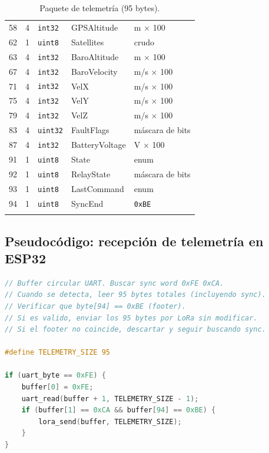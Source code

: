 \documentclass[11pt,a4paper]{article}
\begin{document}
\begin{longtable}{@{}ccllp{4.5cm}@{}}
58 & 4 & \texttt{int32}  & GPSAltitude      & m $\times$ 100 \\
62 & 1 & \texttt{uint8}  & Satellites       & crudo \\
63 & 4 & \texttt{int32}  & BaroAltitude     & m $\times$ 100 \\
67 & 4 & \texttt{int32}  & BaroVelocity     & m/s $\times$ 100 \\
71 & 4 & \texttt{int32}  & VelX             & m/s $\times$ 100 \\
75 & 4 & \texttt{int32}  & VelY             & m/s $\times$ 100 \\
79 & 4 & \texttt{int32}  & VelZ             & m/s $\times$ 100 \\
83 & 4 & \texttt{uint32} & FaultFlags       & máscara de bits \\
87 & 4 & \texttt{int32}  & BatteryVoltage   & V $\times$ 100 \\
91 & 1 & \texttt{uint8}  & State            & enum \\
92 & 1 & \texttt{uint8}  & RelayState       & máscara de bits \\
93 & 1 & \texttt{uint8}  & LastCommand      & enum \\
94 & 1 & \texttt{uint8}  & SyncEnd          & \texttt{0xBE} \\
\bottomrule
\caption{Paquete de telemetría (95 bytes).}
\end{longtable}

\subsection{Pseudocódigo: recepción de telemetría en ESP32}

\begin{lstlisting}[language=C, caption={ESP32: recibir telemetría y reenviar por LoRa.}]
// Buffer circular UART. Buscar sync word 0xFE 0xCA.
// Cuando se detecta, leer 95 bytes totales (incluyendo sync).
// Verificar que byte[94] == 0xBE (footer).
// Si es valido, enviar los 95 bytes por LoRa sin modificar.
// Si el footer no coincide, descartar y seguir buscando sync.

#define TELEMETRY_SIZE 95

if (uart_byte == 0xFE) {
    buffer[0] = 0xFE;
    uart_read(buffer + 1, TELEMETRY_SIZE - 1);
    if (buffer[1] == 0xCA && buffer[94] == 0xBE) {
        lora_send(buffer, TELEMETRY_SIZE);
    }
}
\end{lstlisting}


\end{document}
